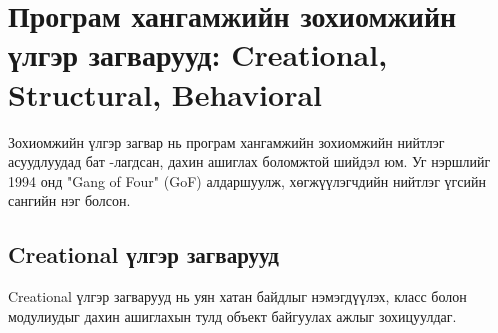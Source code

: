 \section{Програм хангамжийн зохиомжийн үлгэр загварууд: Creational, Structural, Behavioral}
Зохиомжийн үлгэр загвар нь програм хангамжийн зохиомжийн нийтлэг асуудлуудад бат -лагдсан, дахин ашиглах боломжтой шийдэл юм. Уг нэршлийг 1994 онд "Gang of Four" (GoF) алдаршуулж, хөгжүүлэгчдийн нийтлэг үгсийн сангийн нэг болсон.
\subsection{Creational үлгэр загварууд}
Creational үлгэр загварууд нь уян хатан байдлыг нэмэгдүүлэх, класс болон модулиудыг дахин ашиглахын тулд объект байгуулах ажлыг зохицуулдаг.

